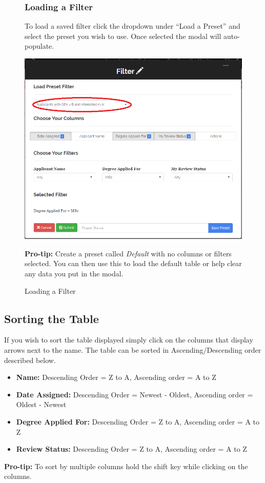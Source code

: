 \documentclass[fontsize=12pt,paper=letter,twoside]{scrartcl}
\begin{document}
\clearpage
\begin{figure}[!htb]
\subsubsection{Loading a Filter}
To load a saved filter click the dropdown under ``Load a Preset'' and select the preset you wish to use. Once selected the modal will auto-populate.
\begin{center}
\includegraphics[width=.99\textwidth]{images/cm/load_preset.png}
\end{center}
\caption{Loading a Filter}
\textbf{Pro-tip:} Create a preset called \emph{Default} with no columns or filters selected. You can then use this to load the default table or help clear any data you put in the modal.
\label{fig:cm:save_filter}
\end{figure}
\clearpage
\newpage
\subsection{Sorting the Table}
If you wish to sort the table displayed simply click on the columns that display arrows next to the name. The table can be sorted in Ascending/Descending order described below.
\begin{itemize}
\item \textbf{Name:} Descending Order = Z to A, Ascending order = A to Z
\item \textbf{Date Assigned:} Descending Order = Newest - Oldest, Ascending order = Oldest - Newest
\item \textbf{Degree Applied For:} Descending Order = Z to A, Ascending order = A to Z
\item \textbf{Review Status:} Descending Order = Z to A, Ascending order = A to Z
\end{itemize}
\textbf{Pro-tip:} To sort by multiple columns hold the shift key while clicking on the columns.
\end{document}
